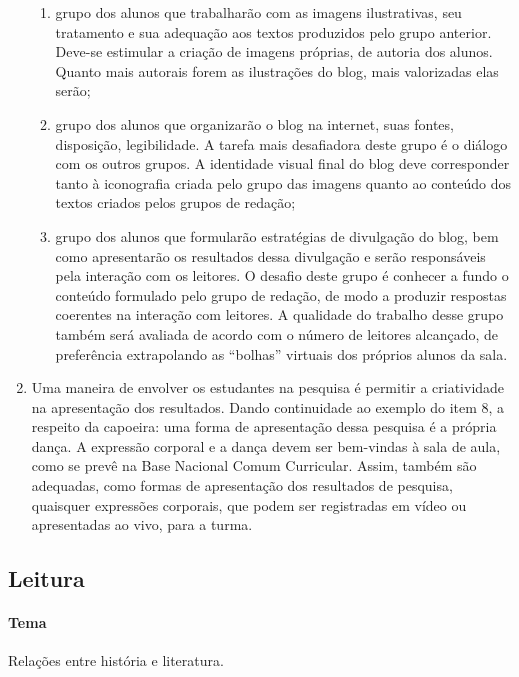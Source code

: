 \documentclass[11pt]{extarticle}
\begin{document}
\begin{enumerate}
\begin{enumerate}
\item grupo dos alunos que trabalharão com as imagens ilustrativas, seu
tratamento e sua adequação aos textos produzidos pelo grupo anterior.
Deve-se estimular a criação de imagens próprias, de autoria dos alunos.
Quanto mais autorais forem as ilustrações do blog, mais valorizadas elas
serão;

\item grupo dos alunos que organizarão o blog na internet, suas fontes,
disposição, legibilidade. A tarefa mais desafiadora deste grupo é o
diálogo com os outros grupos. A identidade visual final do blog deve
corresponder tanto à iconografia criada pelo grupo das imagens quanto ao
conteúdo dos textos criados pelos grupos de redação;

\item grupo dos alunos que formularão estratégias de divulgação do blog,
bem como apresentarão os resultados dessa divulgação e serão
responsáveis pela interação com os leitores. O desafio deste grupo é
conhecer a fundo o conteúdo formulado pelo grupo de redação, de modo a
produzir respostas coerentes na interação com leitores. A qualidade do
trabalho desse grupo também será avaliada de acordo com o número de
leitores alcançado, de preferência extrapolando as ``bolhas'' virtuais
dos próprios alunos da sala.
\end{enumerate}

\item Uma maneira de envolver os estudantes na pesquisa é permitir a
criatividade na apresentação dos resultados. Dando continuidade ao
exemplo do item 8, a respeito da capoeira: uma forma de apresentação
dessa pesquisa é a própria dança. A expressão corporal e a dança devem
ser bem-vindas à sala de aula, como se prevê na Base Nacional Comum
Curricular. Assim, também são adequadas, como formas de apresentação dos
resultados de pesquisa, quaisquer expressões corporais, que podem ser
registradas em vídeo ou apresentadas ao vivo, para a turma.
\end{enumerate}

\subsection{Leitura}

\paragraph{Tema} Relações entre história e literatura.
\end{document}
